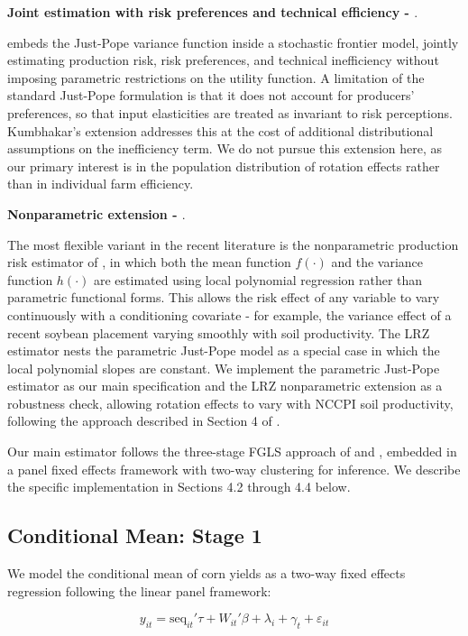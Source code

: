 \documentclass[12pt,letterpaper]{article}
\theoremstyle{remark}
\theoremstyle{remark}
\theoremstyle{plain}
\theoremstyle{definition}
\begin{document}
\medskip\noindent\textbf{Joint estimation with risk preferences and technical efficiency - \cite{Kumbhakar2002}}.

\cite{Kumbhakar2002} embeds the Just-Pope variance function inside a stochastic frontier model, jointly estimating production risk, risk preferences, and technical inefficiency without imposing parametric restrictions on the utility function. A limitation of the standard Just-Pope formulation is that it does not account for producers'  preferences, so that input elasticities are treated as invariant to risk perceptions. Kumbhakar's extension addresses this at the cost of additional distributional assumptions on the inefficiency term. We do not pursue this extension here, as our primary interest is in the population distribution of rotation effects rather than in individual farm efficiency.

\medskip\noindent\textbf{Nonparametric extension - \cite{li2021}}. 

The most flexible variant in the recent literature is the nonparametric production risk estimator of \cite{li2021}, in which both the mean function $f(\cdot)$ and the variance function $h(\cdot)$ are estimated using local polynomial regression rather than parametric functional forms. This allows the risk effect of any variable to vary continuously with a conditioning covariate - for example, the variance effect of a recent soybean placement varying smoothly with soil productivity. The LRZ estimator nests the parametric Just-Pope model as a special case in which the local polynomial slopes are constant. We implement the parametric Just-Pope estimator as our main specification and the LRZ nonparametric extension as a robustness check, allowing rotation effects to vary with NCCPI soil productivity, following the approach described in Section 4 of \cite{li2021}.

Our main estimator follows the three-stage FGLS approach of \cite{Harvey1976} and \cite{Saha1997}, embedded in a panel fixed effects framework with two-way clustering for inference. We describe the specific implementation in Sections 4.2 through 4.4 below.

\subsection{\label{subsec:stage_1}Conditional Mean: Stage 1}
We model the conditional mean of corn yields as a two-way fixed effects regression following the linear panel framework:

\begin{equation}
    y_{it}=\text{seq}_{it}'\tau+ W_{it}'\beta+\lambda_{i}+\gamma_{t}+\varepsilon_{it}\label{eq:stage1}
\end{equation}
\end{document}
